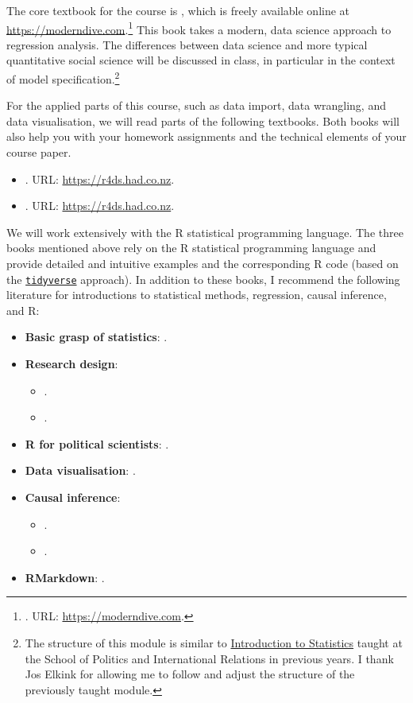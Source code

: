 \documentclass[abstract=on,parskip=full,headings=standardclasses,fontsize=11pt,paper=a4]{scrartcl}
\begin{document}
The core textbook for the course is \textcite{ismay20}, which is freely available online at \url{https://moderndive.com}.\footnote{. URL: \url{https://moderndive.com}.} This book takes a modern, data science approach to regression analysis. The differences between data science and more typical quantitative social science will be discussed in class, in particular in the context of model specification.\footnote{The structure of this module is similar to \href{http://www.joselkink.net/STATS-Autumn-2019.php}{Introduction to Statistics} taught at the School of Politics and International Relations in previous years. I thank Jos Elkink for allowing me to follow and adjust the structure of the previously taught module.}

For the applied parts of this course, such as data import, data wrangling, and data visualisation, we will read parts of the following textbooks. Both books will also help you with your homework assignments and the technical elements of your course paper. 

\begin{itemize}
\item {}. URL: \url{https://r4ds.had.co.nz}.
\item {}. URL: \url{https://r4ds.had.co.nz}.
\end{itemize}


We will work extensively with the \textsf{R} statistical programming language. The three books mentioned above \autocite{ismay20,wickham17,healy19}  rely on the \textsf{R} statistical programming language and provide detailed and intuitive examples and the corresponding \textsf{R} code (based on the \href{https://www.tidyverse.org}{\texttt{tidyverse}} approach). In addition to these books, I recommend the following literature for introductions to statistical methods, regression, causal inference, and \textsf{R}:

\begin{itemize}
\item \textbf{Basic grasp of statistics}: .
\item \textbf{Research design}: 
\begin{itemize}
\item {}.
\item {}.
\end{itemize}
\item \textbf{\textsf{R} for political scientists}: .
\item \textbf{Data visualisation}: .
\item \textbf{Causal inference}: 
\begin{itemize}
\item {}.
\item {}.
\end{itemize}
\item \textbf{RMarkdown}: .
\end{itemize}
\end{document}
